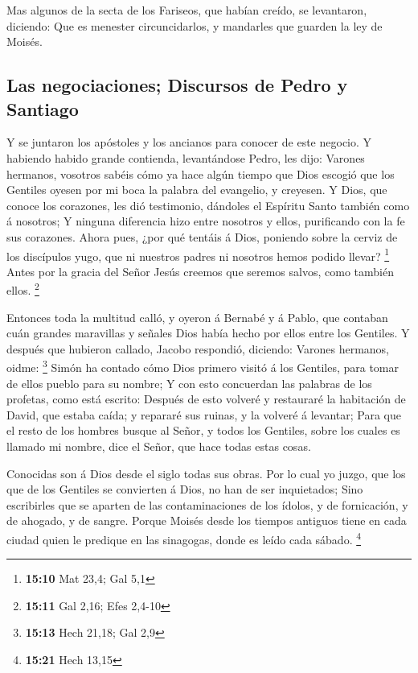  Mas algunos de la secta de los Fariseos, que habían
creído, se levantaron, diciendo: Que es menester circuncidarlos, y
mandarles que guarden la ley de Moisés.

\hypertarget{las-negociaciones-discursos-de-pedro-y-santiago}{%
\subsection{Las negociaciones; Discursos de Pedro y
Santiago}\label{las-negociaciones-discursos-de-pedro-y-santiago}}

 Y se juntaron los apóstoles y los ancianos para conocer
de este negocio.  Y habiendo habido grande contienda,
levantándose Pedro, les dijo: Varones hermanos, vosotros sabéis cómo ya
hace algún tiempo que Dios escogió que los Gentiles oyesen por mi boca
la palabra del evangelio, y creyesen.  Y Dios, que conoce
los corazones, les dió testimonio, dándoles el Espíritu Santo también
como á nosotros;  Y ninguna diferencia hizo entre nosotros
y ellos, purificando con la fe sus corazones.  Ahora
pues, ¿por qué tentáis á Dios, poniendo sobre la cerviz de los
discípulos yugo, que ni nuestros padres ni nosotros hemos podido llevar?
\footnote{\textbf{15:10} Mat 23,4; Gal 5,1}  Antes por la
gracia del Señor Jesús creemos que seremos salvos, como también ellos.
\footnote{\textbf{15:11} Gal 2,16; Efes 2,4-10}

 Entonces toda la multitud calló, y oyeron á Bernabé y á
Pablo, que contaban cuán grandes maravillas y señales Dios había hecho
por ellos entre los Gentiles.  Y después que hubieron
callado, Jacobo respondió, diciendo: Varones hermanos, oidme:
\footnote{\textbf{15:13} Hech 21,18; Gal 2,9}  Simón ha
contado cómo Dios primero visitó á los Gentiles, para tomar de ellos
pueblo para su nombre;  Y con esto concuerdan las
palabras de los profetas, como está escrito:  Después de
esto volveré y restauraré la habitación de David, que estaba caída; y
repararé sus ruinas, y la volveré á levantar;  Para que
el resto de los hombres busque al Señor, y todos los Gentiles, sobre los
cuales es llamado mi nombre, dice el Señor, que hace todas estas cosas.

 Conocidas son á Dios desde el siglo todas sus obras.
 Por lo cual yo juzgo, que los que de los Gentiles se
convierten á Dios, no han de ser inquietados;  Sino
escribirles que se aparten de las contaminaciones de los ídolos, y de
fornicación, y de ahogado, y de sangre.  Porque Moisés
desde los tiempos antiguos tiene en cada ciudad quien le predique en las
sinagogas, donde es leído cada sábado. \footnote{\textbf{15:21} Hech
  13,15}

